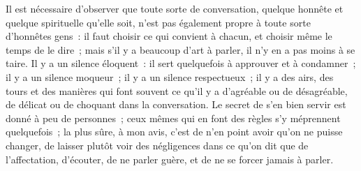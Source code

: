 \documentclass[french,twoside]{book} %
\begin{document}
Il est nécessaire d’observer que toute sorte de conversation, quelque honnête et quelque spirituelle qu’elle soit, n’est pas également propre à toute sorte d’honnêtes gens : il faut choisir ce qui convient à chacun, et choisir même le temps de le dire ; mais s’il y a beaucoup d’art à parler, il n’y en a pas moins à se taire. Il y a un silence éloquent : il sert quelquefois à approuver et à condamner ; il y a un silence moqueur ; il y a un silence respectueux ; il y a des airs, des tours et des manières qui font souvent ce qu’il y a d’agréable ou de désagréable, de délicat ou de choquant dans la conversation. Le secret de s’en bien servir est donné à peu de personnes ; ceux mêmes qui en font des règles s’y méprennent quelquefois ; la plus sûre, à mon avis, c’est de n’en point avoir qu’on ne puisse changer, de laisser plutôt voir des négligences dans ce qu’on dit que de l’affectation, d’écouter, de ne parler guère, et de ne se forcer jamais à parler.
\end{document}
